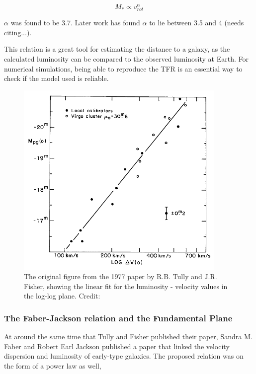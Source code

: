 \begin{equation}
    M_* \propto v_{rot}^\alpha 
\end{equation}

$\alpha$ was found to be 3.7. Later work has found $\alpha$ to lie between 3.5 and 4 (needs citing...).

This relation is a great tool for estimating the distance to a galaxy, as the calculated luminosity can be compared to the observed luminosity at Earth. For numerical simulations, being able to reproduce the TFR is an essential way to check if the model used is reliable.

\begin{figure}
    \centering
    \includegraphics[width=0.9\textwidth]{images/tully_fisher.png}
    \caption{The original figure from the 1977 paper by R.B. Tully and J.R. Fisher, showing the linear fit for the luminosity - velocity values in the log-log plane. Credit: \cite{TullyFisher1977}}
    \label{tully_fisher}
\end{figure}

\subsubsection{The Faber-Jackson relation and the Fundamental Plane}
At around the same time that Tully and Fisher published their paper, Sandra M. Faber and Robert Earl Jackson published a paper that linked the velocity dispersion and luminosity of early-type galaxies. The proposed relation was on the form of a power law as well,

